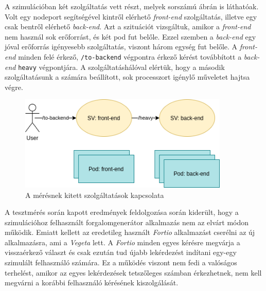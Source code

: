 A szimulációban két szolgáltatás vett részt, melyek  sorszámú ábrán is láthatóak.
Volt egy nodeport segítségével kintről elérhető \textit{front-end} szolgáltatás, illetve egy csak bentről elérhető \textit{back-end}.
Azt a szituációt vizsgáltuk, amikor a \textit{front-end} nem használ sok erőforrást, és két pod fut belőle.
Ezzel szemben a \textit{back-end} egy jóval erőforrás igényesebb szolgáltatás, viszont három egység fut belőle.
A \textit{front-end} minden felé érkező, \verb+/to-backend+ végpontra érkező kérést továbbított a \textit{back-end} \verb+heavy+ végpontjára.
A szolgáltatáshálóval elértük, hogy a második szolgáltatásunk a számára beállított, sok processzort igénylő műveletet hajtsa végre.

\begin{figure}[!ht]
\centering
\includegraphics[width=100mm, keepaspectratio]{figures/sample_measurement.png}
\caption{A mérésnek kitett szolgáltatások kapcsolata}
\label{fig:sample_sg}
\end{figure}

A tesztmérés során kapott eredmények feldolgozása során kiderült, hogy a szimulációhoz felhasznált forgalomgenerátor alkalmazás nem az elvárt módon működik.
Emiatt kellett az eredetileg használt \textit{Fortio} alkalmazást cserélni az új alkalmazásra, ami a \textit{Vegeta} lett.
A \textit{Fortio} minden egyes kérésre megvárja a visszaérkező választ és csak ezután tud újabb lekérdezést indítani egy-egy szimulált felhasználó számára.
Ez a működés viszont nem fedi a valóságos terhelést, amikor az egyes lekérdezések tetszőleges számban érkezhetnek, nem kell megvárni a korábbi felhasználó kérésének kiszolgálását.


